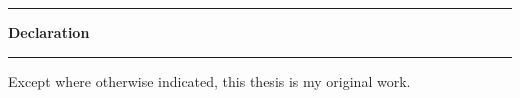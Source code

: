 \thispagestyle{plain}
\begin{center}
    \vspace{0.8cm}
    \rule{18cm}{0.5pt}
    \raggedright
    
    \huge

    \textbf{Declaration}\\
    \rule{18cm}{0.5pt}
    
    \vspace{3cm}
    
    \normalsize
    
    Except where otherwise indicated, this thesis is my original work. 


\end{center}